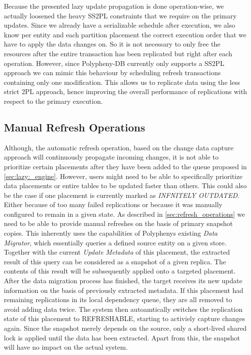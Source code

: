 Because the presented lazy update propagation is done operation-wise, we actually loosened the heavy SS2PL constraints that we require on the primary updates. 
Since we already have a serializable schedule after execution, we also know per entity and each partition placement 
the correct execution order that we have to apply the data changes on. So it is not necessary to only free the resources 
after the entire transaction has been replicated but right after each operation. 
However, since Polypheny-DB currently only supports a SS2PL approach we can 
mimic this behaviour by scheduling refresh transactions containing only one modification.
This allows us to replicate data using the less strict 2PL approach, hence improving the overall performance of replications with respect to the primary execution.



\subsection{Manual Refresh Operations}
\label{sec:manual_refresh}

Although, the automatic refresh operation, based on the change data capture approach will continuously propagate incoming changes,
it is not able to prioritize certain placements after they have been added to the queue proposed in \ref{sec:lazy:_engine}.
However, users might need to be able to specifically prioritize data placements or entire tables to be updated faster than others. 
This could also be the case if one placement is currently marked as \emph{INFNITELY OUTDATED}.
Either because of too many failed replications or because it was manually configured to remain in a given state. 
As described in \ref{sec:refresh_operations} we need to be able to provide manual refreshes on the basis of primary snapshot copies.
This inherently uses the capabilities of Polyphenys existing \emph{Data Migrator}, which essentially queries a defined source entity on a given store. 
Together with the current \emph{Update Metadata} of this placement, the extracted result of this query can be considered as a snapshot of a given replica.
The contents of this result will be subsequently applied onto a targeted placement.\\
After the data migration process has finished, the target receives its new update information on the basis of previously extracted metadata.
If this placement had remaining replications in its local dependency queue, they are all removed to avoid adding data twice. 
The system then autoamtically switches the replication state of this placement to REFRESHABLE, starting to activiely capture changes again.
Since the snapshot merely depends on the source, only a short-lived shared lock is applied until the data has been extracted. Apart from this, the snapshot will have no impact
on the actual system.\\



